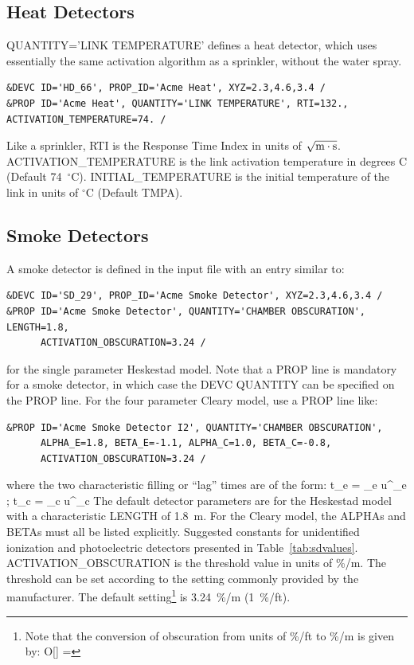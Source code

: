 \documentclass[11pt]{book}
\begin{document}
\subsection{Heat Detectors}
\label{info:heat_detectors}

{\ct QUANTITY='LINK TEMPERATURE'} defines a heat detector, which uses essentially the same activation algorithm as a sprinkler, without the water spray.
\begin{lstlisting}
&DEVC ID='HD_66', PROP_ID='Acme Heat', XYZ=2.3,4.6,3.4 /
&PROP ID='Acme Heat', QUANTITY='LINK TEMPERATURE', RTI=132., ACTIVATION_TEMPERATURE=74. /
\end{lstlisting}
Like a sprinkler, {\ct RTI} is the Response Time Index in units of $\sqrt{\hbox{m}\cdot \hbox{s}}$. {\ct ACTIVATION\_TEMPERATURE} is the link activation temperature in degrees C (Default 74~$^\circ$C). {\ct INITIAL\_TEMPERATURE} is the initial temperature of the link in units of $^\circ$C (Default {\ct TMPA}).



\subsection{Smoke Detectors}
\label{info:smoke_detector}

A smoke detector is defined in the input file with an entry similar to:
\begin{lstlisting}
&DEVC ID='SD_29', PROP_ID='Acme Smoke Detector', XYZ=2.3,4.6,3.4 /
&PROP ID='Acme Smoke Detector', QUANTITY='CHAMBER OBSCURATION', LENGTH=1.8,
      ACTIVATION_OBSCURATION=3.24 /
\end{lstlisting}
for the single parameter Heskestad model. Note that a {\ct PROP} line is mandatory for a smoke detector, in which case the {\ct DEVC QUANTITY} can be specified on the {\ct PROP} line. For the four parameter Cleary model, use a {\ct PROP} line like:
\begin{lstlisting}
&PROP ID='Acme Smoke Detector I2', QUANTITY='CHAMBER OBSCURATION',
      ALPHA_E=1.8, BETA_E=-1.1, ALPHA_C=1.0, BETA_C=-0.8,
      ACTIVATION_OBSCURATION=3.24 /
\end{lstlisting}
where the two characteristic filling or ``lag'' times are of the form:
\be
   \delta t_e = \alpha_e u^{\beta_e} \quad ; \quad \delta t_c = \alpha_c u^{\beta_c}
\ee
The default detector parameters are for the Heskestad model with a characteristic {\ct LENGTH} of 1.8~m. For the Cleary model, the {\ct ALPHA}s and {\ct BETA}s must all be listed explicitly. Suggested constants for unidentified ionization and photoelectric detectors presented in Table~\ref{tab:sdvalues}. {\ct ACTIVATION\_OBSCURATION} is the threshold value in units of \%/m. The threshold can be set according to the setting commonly provided by the manufacturer. The default setting\footnote{Note that the conversion of obscuration from units of \%/ft to \%/m is given by:
\be
   O[] =  
\ee
} is 3.24~\%/m (1~\%/ft).
\end{document}
